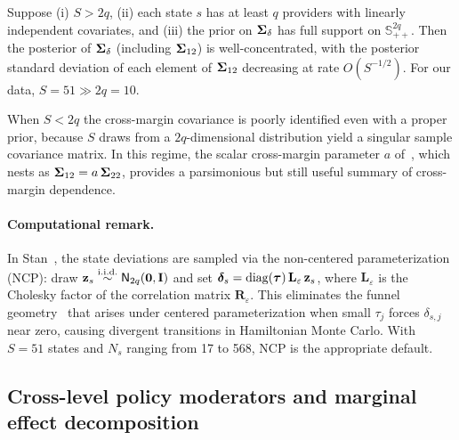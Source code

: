 \begin{proposition}
  \label{prop:sigma12-id}
  Suppose (i) $S > 2q$, (ii) each state $s$ has at least $q$ providers with
  linearly independent covariates, and (iii) the prior on $\boldsymbol{\Sigma}_\delta$ has
  full support on $\mathbb{S}_{++}^{2q}$. Then the posterior of $\boldsymbol{\Sigma}_\delta$
  (including $\boldsymbol{\Sigma}_{12}$) is well-concentrated, with the posterior standard
  deviation of each element of $\boldsymbol{\Sigma}_{12}$ decreasing at rate $O(S^{-1/2})$.
  For our data, $S = 51 \gg 2q = 10$.
\end{proposition}

\begin{remark}\label{rem:boundary}
  When $S < 2q$ the cross-margin covariance is poorly identified even with a
  proper prior, because $S$ draws from a $2q$-dimensional distribution yield a
  singular sample covariance matrix. In this regime, the scalar cross-margin
  parameter $a$ of~\citet{GhosalEtAl2020}, which nests as
  $\boldsymbol{\Sigma}_{12} = a\,\boldsymbol{\Sigma}_{22}$, provides a parsimonious but still useful
  summary of cross-margin dependence.
\end{remark}

\paragraph{Computational remark.}
In Stan~\citep{CarpenterEtAl2017}, the state deviations are sampled via the non-centered
parameterization (NCP): draw $\mathbf{z}_s \overset{\mathrm{i.i.d.}}{\sim} \textsf{N}_{2q}(\mathbf{0},\mathbf{I})$
and set $\boldsymbol{\delta}_s = \operatorname{diag}(\boldsymbol{\tau})\,\mathbf{L}_\varepsilon\,\mathbf{z}_s$,
where $\mathbf{L}_\varepsilon$ is the Cholesky factor of the
correlation matrix $\mathbf{R}_\varepsilon$. This eliminates the funnel
geometry~\citep{BetancourtGirolami2015} that arises under centered parameterization when small $\tau_j$ forces
$\delta_{s,j}$ near zero, causing divergent transitions in Hamiltonian Monte
Carlo. With $S = 51$ states and $N_s$ ranging from 17 to 568, NCP is the
appropriate default.


\subsection{Cross-level policy moderators and marginal effect decomposition}
\label{sec:policy}

